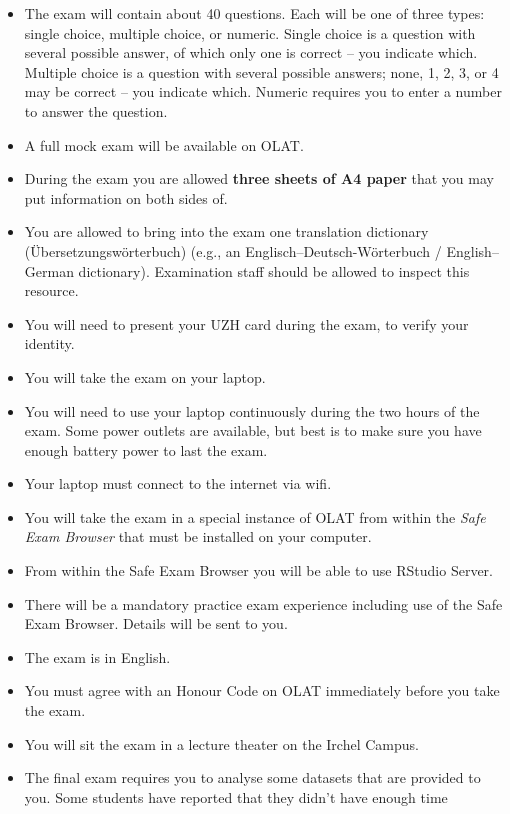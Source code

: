 \documentclass[
  letterpaper,
  8pt,
  a4paper]{book}
\providecommand{\tightlist}{%
  \setlength{\itemsep}{0pt}\setlength{\parskip}{0pt}}
\begin{document}
\begin{itemize}
\tightlist
\item
  The exam will contain about 40 questions. Each will be one of three
  types: single choice, multiple choice, or numeric. Single choice is a
  question with several possible answer, of which only one is correct --
  you indicate which. Multiple choice is a question with several
  possible answers; none, 1, 2, 3, or 4 may be correct -- you indicate
  which. Numeric requires you to enter a number to answer the question.
\item
  A full mock exam will be available on OLAT.
\item
  During the exam you are allowed \textbf{three sheets of A4 paper} that
  you may put information on both sides of.
\item
  You are allowed to bring into the exam one translation dictionary
  (Übersetzungswörterbuch) (e.g., an Englisch--Deutsch-Wörterbuch /
  English--German dictionary). Examination staff should be allowed to
  inspect this resource.
\item
  You will need to present your UZH card during the exam, to verify your
  identity.
\item
  You will take the exam on your laptop.
\item
  You will need to use your laptop continuously during the two hours of
  the exam. Some power outlets are available, but best is to make sure
  you have enough battery power to last the exam.
\item
  Your laptop must connect to the internet via wifi.
\item
  You will take the exam in a special instance of OLAT from within the
  \emph{Safe Exam Browser} that must be installed on your computer.
\item
  From within the Safe Exam Browser you will be able to use RStudio
  Server.
\item
  There will be a mandatory practice exam experience including use of
  the Safe Exam Browser. Details will be sent to you.
\item
  The exam is in English.
\item
  You must agree with an Honour Code on OLAT immediately before you take
  the exam.
\item
  You will sit the exam in a lecture theater on the Irchel Campus.
\item
  The final exam requires you to analyse some datasets that are provided
  to you. Some students have reported that they didn't have enough time

\end{itemize}
\end{document}
